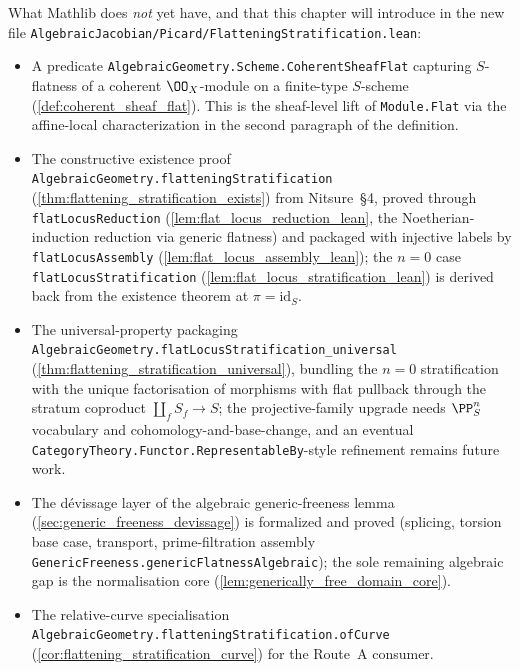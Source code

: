\noindent What Mathlib does \emph{not} yet have, and that this chapter will
introduce in the new file
\texttt{AlgebraicJacobian/Picard/FlatteningStratification.lean}:
\begin{itemize}
  \item A predicate \texttt{AlgebraicGeometry.Scheme.CoherentSheafFlat}
    capturing \(S\)-flatness of a coherent \(\OO_X\)-module on a finite-type
    \(S\)-scheme (\cref{def:coherent_sheaf_flat}). This is the
    sheaf-level lift of \texttt{Module.Flat} via the affine-local
    characterization in the second paragraph of the definition.
  \item The constructive existence proof
    \texttt{AlgebraicGeometry.flatteningStratification}
    (\cref{thm:flattening_stratification_exists}) from Nitsure~\S4, proved
    through \texttt{flatLocusReduction}
    (\cref{lem:flat_locus_reduction_lean}, the Noetherian-induction
    reduction via generic flatness) and packaged with injective labels by
    \texttt{flatLocusAssembly} (\cref{lem:flat_locus_assembly_lean}); the
    \(n = 0\) case \texttt{flatLocusStratification}
    (\cref{lem:flat_locus_stratification_lean}) is derived back from the
    existence theorem at \(\pi = \mathrm{id}_S\).
  \item The universal-property packaging
    \texttt{AlgebraicGeometry.flatLocusStratification\_universal}
    (\cref{thm:flattening_stratification_universal}), bundling the \(n = 0\)
    stratification with the unique factorisation of morphisms with flat
    pullback through the stratum coproduct \(\coprod_f S_f \to S\); the
    projective-family upgrade needs \(\PP^n_S\) vocabulary and
    cohomology-and-base-change, and an eventual
    \texttt{CategoryTheory.Functor.RepresentableBy}-style refinement remains
    future work.
  \item The dévissage layer of the algebraic generic-freeness lemma
    (\cref{sec:generic_freeness_devissage}) is formalized and proved
    (splicing, torsion base case, transport, prime-filtration assembly
    \texttt{GenericFreeness.genericFlatnessAlgebraic}); the sole remaining
    algebraic gap is the normalisation core
    (\cref{lem:generically_free_domain_core}).
  \item The relative-curve specialisation
    \texttt{AlgebraicGeometry.flatteningStratification.ofCurve}
    (\cref{cor:flattening_stratification_curve}) for the Route~A
    consumer.
\end{itemize}

